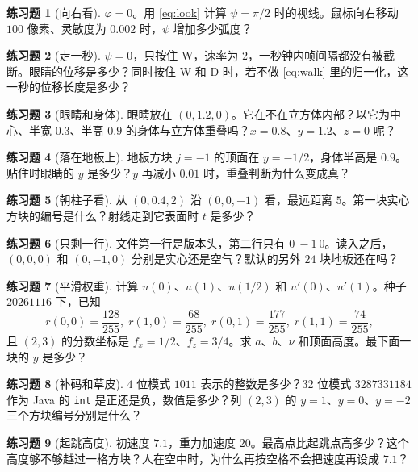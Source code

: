 \documentclass[12pt,a4paper]{article}
\theoremstyle{definition}
\newtheorem{exercise}{练习题}
\theoremstyle{plain}
\theoremstyle{remark}
\begin{document}
\begin{exercise}[向右看]
$\varphi=0$。用 \eqref{eq:look} 计算 $\psi=\pi/2$ 时的视线。鼠标向右移动 $100$ 像素、灵敏度为 $0.002$ 时，$\psi$ 增加多少弧度？
\end{exercise}

\begin{exercise}[走一秒]
$\psi=0$，只按住 W，速率为 $2$，一秒钟内帧间隔都没有被截断。眼睛的位移是多少？同时按住 W 和 D 时，若不做 \eqref{eq:walk} 里的归一化，这一秒的位移长度是多少？
\end{exercise}

\begin{exercise}[眼睛和身体]
眼睛放在 $(0,1.2,0)$。它在不在立方体内部？以它为中心、半宽 $0.3$、半高 $0.9$ 的身体与立方体重叠吗？$x=0.8$、$y=1.2$、$z=0$ 呢？
\end{exercise}

\begin{exercise}[落在地板上]
地板方块 $j=-1$ 的顶面在 $y=-1/2$，身体半高是 $0.9$。贴住时眼睛的 $y$ 是多少？$y$ 再减小 $0.01$ 时，重叠判断为什么变成真？
\end{exercise}

\begin{exercise}[朝柱子看]
从 \((0,0.4,2)\) 沿 \((0,0,-1)\) 看，最远距离 \(5\)。第一块实心方块的编号是什么？射线走到它表面时 \(t\) 是多少？
\end{exercise}

\begin{exercise}[只剩一行]
文件第一行是版本头，第二行只有 \(0\ -1\ 0\)。读入之后，\((0,0,0)\) 和 \((0,-1,0)\) 分别是实心还是空气？默认的另外 \(24\) 块地板还在吗？
\end{exercise}

\begin{exercise}[平滑权重]
计算 \(u(0)\)、\(u(1)\)、\(u(1/2)\) 和 \(u'(0)\)、\(u'(1)\)。种子 \(20261116\) 下，已知
\[
r(0,0)=\frac{128}{255},\;
r(1,0)=\frac{68}{255},\;
r(0,1)=\frac{177}{255},\;
r(1,1)=\frac{74}{255},
\]
且 \((2,3)\) 的分数坐标是 \(f_x=1/2\)、\(f_z=3/4\)。求 \(a\)、\(b\)、\(\nu\) 和顶面高度。最下面一块的 \(y\) 是多少？
\end{exercise}

\begin{exercise}[补码和草皮]
\(4\) 位模式 \(1011\) 表示的整数是多少？\(32\) 位模式 \(3287331184\) 作为 Java 的 \texttt{int} 是正还是负，数值是多少？列 \((2,3)\) 的 \(y=1\)、\(y=0\)、\(y=-2\) 三个方块编号分别是什么？
\end{exercise}

\begin{exercise}[起跳高度]
初速度 \(7.1\)，重力加速度 \(20\)。最高点比起跳点高多少？这个高度够不够越过一格方块？人在空中时，为什么再按空格不会把速度再设成 \(7.1\)？
\end{exercise}
\end{document}
